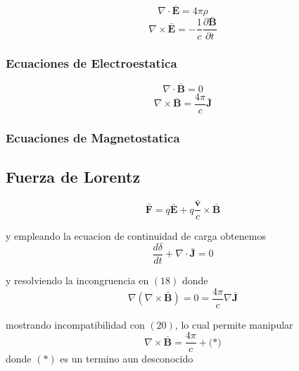 \documentclass{article}
\begin{document}
	\begin{minipage}{.45\textwidth}
		\begin{equation}
			\nabla\cdot\mathbf{\bar{E}} = 4 \pi \rho
		\end{equation}
		\begin{equation}
			\nabla\times\mathbf{\bar{E}} = -\frac{1}{c} \frac{\partial \mathbf{\bar{B}}}{\partial t}
		\end{equation}
		\subsubsection*{Ecuaciones de Electroestatica}
	\end{minipage}   
	\begin{minipage}{.45\textwidth}
		\begin{equation}
			\nabla \cdot \mathbf{\bar{B}} = 0 
		\end{equation}
		\begin{equation}
			\nabla \times \mathbf{\bar{B}} = \frac{4\pi}{c} \mathbf{\bar{J}}
		\end{equation}
		\subsubsection*{Ecuaciones de Magnetostatica}
		
	\end{minipage}
	
	
	\subsection{Fuerza de Lorentz}
	\[
	\mathbf{\bar{F}} = q\mathbf{\bar{E}} + q\frac{\mathbf{\bar{v}}}{c} \times \mathbf{\bar{B}}
	\]
	
	y empleando la ecuacion de continuidad de carga obtenemos
	\begin{equation}
		\frac{d\delta}{dt} + \nabla \cdot \mathbf{\bar{J}}=0 
	\end{equation}
	
	y resolviendo la incongruencia en \((18)\) donde
	\begin{equation}
		\nabla(\nabla\times\mathbf{\bar{B}})=0=\frac{4\pi}{c}\nabla\mathbf{\bar{J}} 
	\end{equation}
	
	mostrando incompatibilidad con \((20)\), lo cual permite manipular
	\begin{equation*}
		\nabla\times\mathbf{\bar{B}}=\frac{4\pi}{c} + \text{(*)}
	\end{equation*}
	donde \((*)\) es un termino aun desconocido
	
\end{document}
